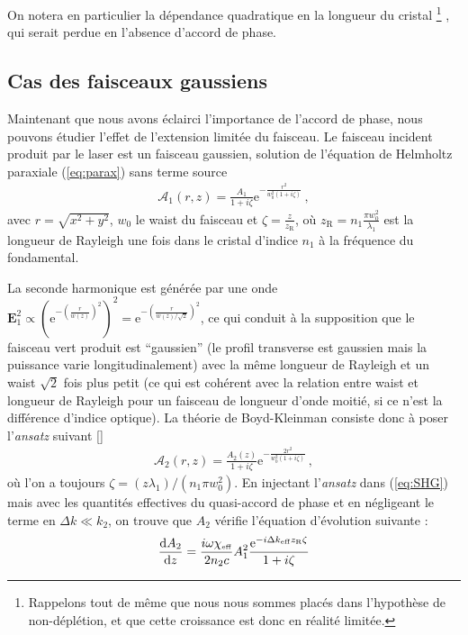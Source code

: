 \documentclass[11pt,a4paper]{article}
\newcommand{\ncite}[1]{[\citenum{#1}]}
\newcommand{\zr}{z_\mathsc{R}}
\newcommand{\A}{\mathcal{A}}
\newcommand{\e}[1]{\text{e}^{#1}}
\newcommand{\mathsc}[1]{\mathrm{\scriptscriptstyle {#1}}}
\renewcommand{\v}[1]{\boldsymbol{\mathbf{#1}}}
\begin{document}
On notera en particulier la dépendance quadratique en la longueur du cristal \footnote{Rappelons tout de même que nous nous sommes placés dans l'hypothèse de non-déplétion, et que cette croissance est donc en réalité limitée.}
, qui serait perdue en l'absence d'accord de phase. 

\subsection{Cas des faisceaux gaussiens} 
\label{gaussien}
Maintenant que nous avons éclairci l'importance de l'accord de phase, nous pouvons étudier l'effet de l'extension limitée du faisceau. Le faisceau incident produit par le laser est un faisceau gaussien, solution de l'équation de Helmholtz paraxiale (\ref{eq:parax}) sans terme source
\begin{align}
\A_1(r,z) = \frac{A_1}{1+i\zeta} \e{-\frac{r^{2}}{w_{0}^{2} (1+i\zeta) }} \,,
\end{align}
avec $r=\sqrt{x^2+y^2}$, $w_0$ le waist du faisceau et $\zeta = \frac{z}{z_\mathsc{R}}$, où $\zr= n_1 \frac{\pi w_0^2}{\lambda_1}$ est la longueur de Rayleigh une fois dans le cristal d'indice $n_1$ à la fréquence du fondamental.

La seconde harmonique est générée par une onde $\v E_1^2 \propto \left( \e{-\left(\frac{r}{w(z)}\right)^2} \right)^2 = \e{-\left(\frac{r}{w(z)/ \sqrt 2}\right)^2}$, ce qui conduit à la supposition que le faisceau vert produit est ``gaussien'' (le profil transverse est gaussien mais la puissance varie longitudinalement) avec la même longueur de Rayleigh et un waist $\sqrt 2$ fois plus petit (ce qui est cohérent avec la relation entre waist et longueur de Rayleigh pour un faisceau de longueur d'onde moitié, si ce n'est la différence d'indice optique).
La théorie de Boyd-Kleinman consiste donc à poser l'\textit{ansatz} suivant \ncite{boyd}
\begin{align}
\A_2(r,z) = \frac{A_2(z)}{1+i\zeta}\e{-\frac{2r^{2}}{w_{0}^{2} (1+i\zeta) }} \,,
\end{align}
où l'on a toujours $\zeta = (z\lambda_1)/(n_1 \pi w_{0}^{2})$. %
En injectant l'\textit{ansatz} dans (\ref{eq:SHG}) mais avec les quantités effectives du quasi-accord de phase et en négligeant le terme en $\Delta k \ll k_2$, on trouve que $A_2$ vérifie l'équation d'évolution suivante :
\begin{align} 
	\dv{A_2}{z} = \frac{i\omega \chi_\mathsc{eff}}{2 n_2 c} A_1^2 \frac{\e{-i\Delta k_\mathsc{eff} \zr \zeta}}{1+i\zeta} 
	\label{eq:BKDE}
\end{align}
\end{document}
